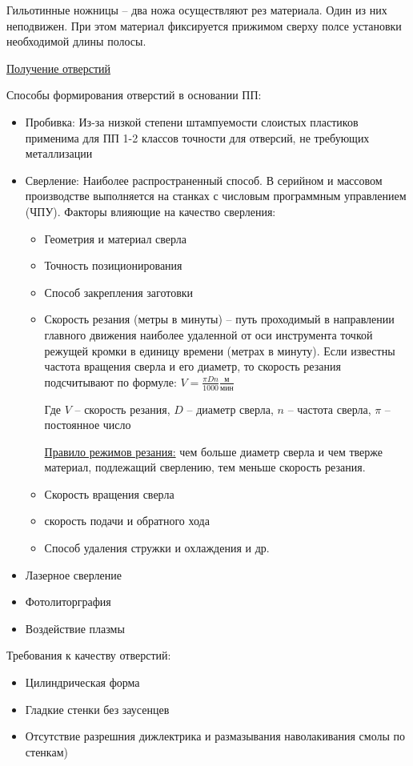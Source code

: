 \documentclass{article}
\begin{document}
Гильотинные ножницы -- два ножа осуществляют рез материала. Один из них неподвижен. При этом материал фиксируется прижимом сверху полсе установки необходимой длины полосы.

\underline{Получение отверстий}

Способы формирования отверстий в основании ПП:
\begin{itemize}
	\item Пробивка: Из-за низкой степени штампуемости слоистых пластиков применима для ПП 1-2 классов точности для отверсий, не требующих металлизации
	\item Сверление: Наиболее распространенный способ. В серийном и массовом производстве выполняется на станках с числовым программным управлением (ЧПУ). Факторы влияющие на качество сверления:
	\begin{itemize}
		\item Геометрия и материал сверла
		\item Точность позиционирования
		\item Способ закрепления заготовки
		\item Скорость резания (метры в минуты) -- путь проходимый в направлении главного движения наиболее удаленной от оси инструмента точкой режущей кромки в единицу времени (метрах в минуту). Если известны частота вращения сверла и его диаметр, то скорость резания подсчитывают по формуле: $V = \frac{\pi D n}{1000} \frac{м}{мин} $

		Где $V$ -- скорость резания, $D$ -- диаметр сверла, $n$ -- частота сверла, $\pi$ -- постоянное число

		\underline{Правило режимов резания:} чем больше диаметр сверла и чем тверже материал, подлежащий сверлению, тем меньше скорость резания. 
		\item Скорость вращения сверла
		\item скорость подачи и обратного хода
		\item Способ удаления стружки и охлаждения и др.
	\end{itemize}
	\item Лазерное сверление
	\item Фотолиторграфия
	\item Воздействие плазмы
\end{itemize}

Требования к качеству отверстий:
\begin{itemize}
	\item Цилиндрическая форма
	\item Гладкие стенки без заусенцев
	\item Отсутствие разрешния дижлектрика и размазывания наволакивания смолы по стенкам)
\end{itemize}
\end{document}
